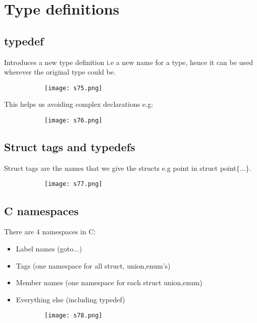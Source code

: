 \documentclass[8pt]{extreport}
\begin{document}
\section{Type definitions}

\subsection{typedef}

Introduces a new type definition i.e a new name for a type, hence it can be used wherever the original type could be.
\begin{figure}[H]
\centering
\begin{subfigure}[b]{0.4\linewidth}
\texttt{[image: s75.png]}
\end{subfigure}
\end{figure}
This helps us avoiding complex declarations e.g:
\begin{figure}[H]
\centering
\begin{subfigure}[b]{0.4\linewidth}
\texttt{[image: s76.png]}
\end{subfigure}
\end{figure}

\subsection{Struct tags and typedefs}

Struct tags are the names that we give the structs e.g point in struct point$\{...\}$.
\begin{figure}[H]
\centering
\begin{subfigure}[b]{0.4\linewidth}
\texttt{[image: s77.png]}
\end{subfigure}
\end{figure}

\subsection{C namespaces}

There are 4 namespaces in C:
\begin{itemize}
\item Label names (goto...)
\item Tags (one namespace for all struct, union,enum's)
\item Member names (one namespace for each struct union,enum)
\item Everything else (including typedef) 
\end{itemize}
\begin{figure}[H]
\centering
\begin{subfigure}[b]{0.4\linewidth}
\texttt{[image: s78.png]}
\end{subfigure}
\end{figure}
\end{document}
